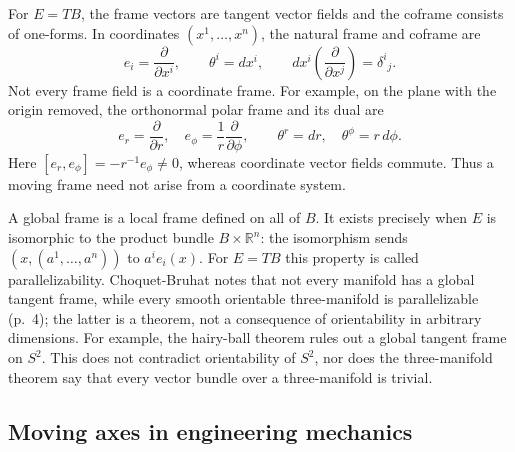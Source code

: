 For $E=TB$, the frame vectors are tangent vector fields and the coframe
consists of one-forms.  In coordinates $(x^1,\ldots,x^n)$, the natural
frame and coframe are
\begin{equation}\label{eq:gal-natural-frame}
 e_i=\frac{\partial}{\partial x^i},\qquad
 \theta^i=dx^i,\qquad
 dx^i\!\left(\frac{\partial}{\partial x^j}\right)=\delta^i{}_j.
\end{equation}
Not every frame field is a coordinate frame.  For example, on the plane
with the origin removed, the orthonormal polar frame and its dual are
\begin{equation}\label{eq:gal-polar-frame}
 e_r=\frac{\partial}{\partial r},\quad
 e_\phi=\frac{1}{r}\frac{\partial}{\partial\phi},\qquad
 \theta^r=dr,\quad\theta^\phi=r\,d\phi.
\end{equation}
Here $[e_r,e_\phi]=-r^{-1}e_\phi\ne0$, whereas coordinate vector fields
commute.  Thus a moving frame need not arise from a coordinate system.

A global frame is a local frame defined on all of $B$.  It exists precisely
when $E$ is isomorphic to the product bundle $B\times\mathbb R^n$: the
isomorphism sends $(x,(a^1,\ldots,a^n))$ to $a^i e_i(x)$.  For $E=TB$
this property is called parallelizability.  Choquet-Bruhat notes that not
every manifold has a global tangent frame, while every smooth orientable
three-manifold is parallelizable (p.~4); the latter is a theorem, not a
consequence of orientability in arbitrary dimensions.  For example, the
hairy-ball theorem rules out a global tangent frame on $S^2$.  This does not
contradict orientability of $S^2$, nor does the three-manifold theorem say
that every vector bundle over a three-manifold is trivial.

\subsection{Moving axes in engineering mechanics}

